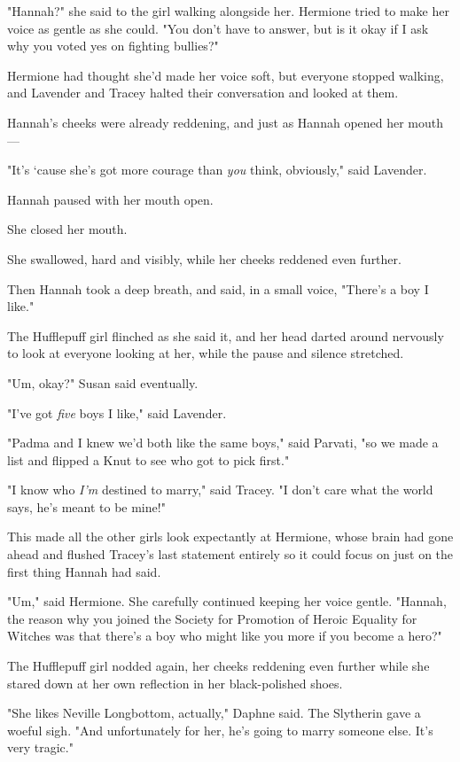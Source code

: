 "Hannah?" she said to the girl walking alongside her. Hermione tried to make
her voice as gentle as she could. "You don't have to answer, but is it okay if
I ask why you voted yes on fighting bullies?"

Hermione had thought she'd made her voice soft, but everyone stopped walking,
and Lavender and Tracey halted their conversation and looked at them.

Hannah's cheeks were already reddening, and just as Hannah opened her mouth---

"It's `cause she's got more courage than \emph{you} think, obviously," said
Lavender.

Hannah paused with her mouth open.

She closed her mouth.

She swallowed, hard and visibly, while her cheeks reddened even further.

Then Hannah took a deep breath, and said, in a small voice, "There's a boy I
like."

The Hufflepuff girl flinched as she said it, and her head darted around
nervously to look at everyone looking at her, while the pause and silence
stretched.

"Um, okay?" Susan said eventually.

"I've got \emph{five} boys I like," said Lavender.

"Padma and I knew we'd both like the same boys," said Parvati, "so we made a
list and flipped a Knut to see who got to pick first."

"I know who \emph{I'm} destined to marry," said Tracey. "I don't care what the
world says, he's meant to be mine!"

This made all the other girls look expectantly at Hermione, whose brain had
gone ahead and flushed Tracey's last statement entirely so it could focus on
just on the first thing Hannah had said.

"Um," said Hermione. She carefully continued keeping her voice gentle. "Hannah,
the reason why you joined the Society for Promotion of Heroic Equality for
Witches was that there's a boy who might like you more if you become a hero?"

The Hufflepuff girl nodded again, her cheeks reddening even further while she
stared down at her own reflection in her black-polished shoes.

"She likes Neville Longbottom, actually," Daphne said. The Slytherin gave a
woeful sigh. "And unfortunately for her, he's going to marry someone else. It's
very tragic."

